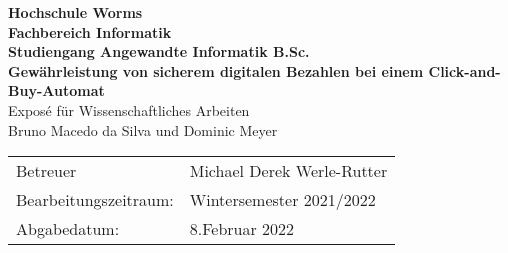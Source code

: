 \begin{titlepage}
    \vspace*{2mm}
    \begin{center}
        \Large
        \textbf{Hochschule Worms}\\
        \textbf{Fachbereich Informatik}\\
        \textbf{Studiengang Angewandte Informatik B.Sc.}\\
        \vspace{1cm}
        \textbf{Gewährleistung von sicherem digitalen Bezahlen bei einem Click-and-Buy-Automat}\\
        \vspace{1cm}
        \large
        Exposé für Wissenschaftliches Arbeiten\\
        \vspace{1cm}
        Bruno Macedo da Silva und Dominic Meyer
        \vspace{3cm}
        \large
        \vspace{4cm}
         \begin {table}[ht]
             \centering
             \begin{tabular}{l l}
                Betreuer                & Michael Derek Werle-Rutter \\
                Bearbeitungszeitraum:   & Wintersemester 2021/2022 \\
                Abgabedatum:            & 8.Februar 2022 \\
             \end{tabular}
         \end {table}
    \end{center}
    \normalsize
    \vfill
 


\end{titlepage}